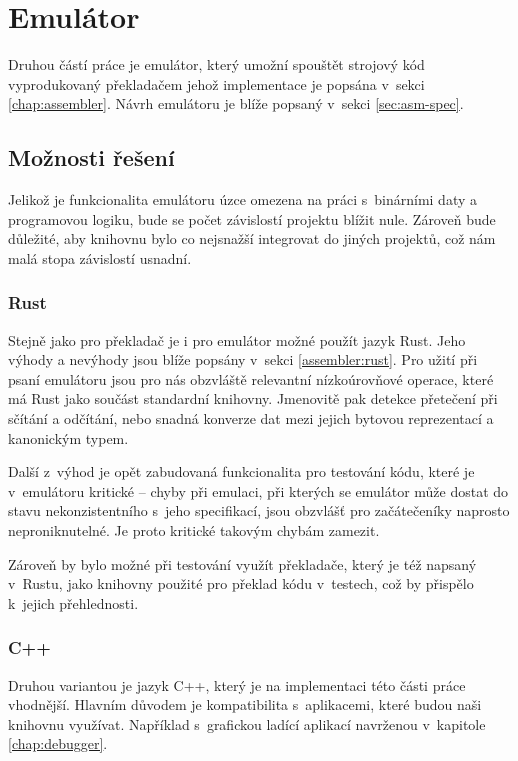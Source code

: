 \chapter{Emulátor}
\label{chap:emulator}

Druhou částí práce je emulátor, který umožní spouštět strojový kód vyprodukovaný překladačem jehož implementace je popsána v~sekci \ref{chap:assembler}. Návrh emulátoru je blíže popsaný v~sekci \ref{sec:asm-spec}.

\section{Možnosti řešení}

Jelikož je funkcionalita emulátoru úzce omezena na práci s~binárními daty a programovou logiku, bude se počet závislostí projektu blížit nule. Zároveň bude důležité, aby knihovnu bylo co nejsnažší integrovat do jiných projektů, což nám malá stopa závislostí usnadní.

\subsection{Rust}

Stejně jako pro překladač je i pro emulátor možné použít jazyk Rust. Jeho výhody a nevýhody jsou blíže popsány v~sekci \ref{assembler:rust}. Pro užití při psaní emulátoru jsou pro nás obzvláště relevantní nízkoúrovňové operace, které má Rust jako součást standardní knihovny. Jmenovitě pak detekce přetečení při sčítání a odčítání, nebo snadná konverze dat mezi jejich bytovou reprezentací a kanonickým typem.

Další z~výhod je opět zabudovaná funkcionalita pro testování kódu, které je v~emulátoru kritické -- chyby při emulaci, při kterých se emulátor může dostat do stavu nekonzistentního s~jeho specifikací, jsou obzvlášť pro začátečeníky naprosto neproniknutelné. Je proto kritické takovým chybám zamezit.

Zároveň by bylo možné při testování využít překladače, který je též napsaný v~Rustu, jako knihovny použité pro překlad kódu v~testech, což by přispělo k~jejich přehlednosti.

\subsection{C++}

Druhou variantou je jazyk C++, který je na implementaci této části práce vhodnější. Hlavním důvodem je kompatibilita s~aplikacemi, které budou naši knihovnu využívat. Například s~grafickou ladící aplikací navrženou v~kapitole \ref{chap:debugger}.

